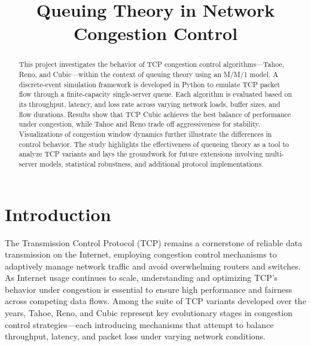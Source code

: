 \documentclass[conference]{IEEEtran}
\begin{document}
\title{Queuing Theory in Network Congestion Control}

\author{
}

\maketitle
\thispagestyle{plain}
\pagestyle{plain}

\begin{abstract}
    This project investigates the behavior of TCP congestion control algorithms—Tahoe, Reno, and Cubic—within the context of queuing theory using an M/M/1 model. 
    A discrete-event simulation framework is developed in Python to emulate TCP packet flow through a finite-capacity single-server queue. 
    Each algorithm is evaluated based on its throughput, latency, and loss rate across varying network loads, buffer sizes, and flow durations. 
    Results show that TCP Cubic achieves the best balance of performance under congestion, while Tahoe and Reno trade off aggressiveness for stability. 
    Visualizations of congestion window dynamics further illustrate the differences in control behavior. 
    The study highlights the effectiveness of queueing theory as a tool to analyze TCP variants and lays the groundwork for future extensions involving multi-server models, statistical robustness, and additional protocol implementations.
\end{abstract}


\section{Introduction}
The Transmission Control Protocol (TCP) remains a cornerstone of reliable data transmission on the Internet, employing congestion control mechanisms to adaptively manage network traffic and avoid overwhelming routers and switches. 
As Internet usage continues to scale, understanding and optimizing TCP's behavior under congestion is essential to ensure high performance and fairness across competing data flows. 
Among the suite of TCP variants developed over the years, Tahoe, Reno, and Cubic represent key evolutionary stages in congestion control strategies—each introducing mechanisms that attempt to balance throughput, latency, and packet loss under varying network conditions.
\end{document}
